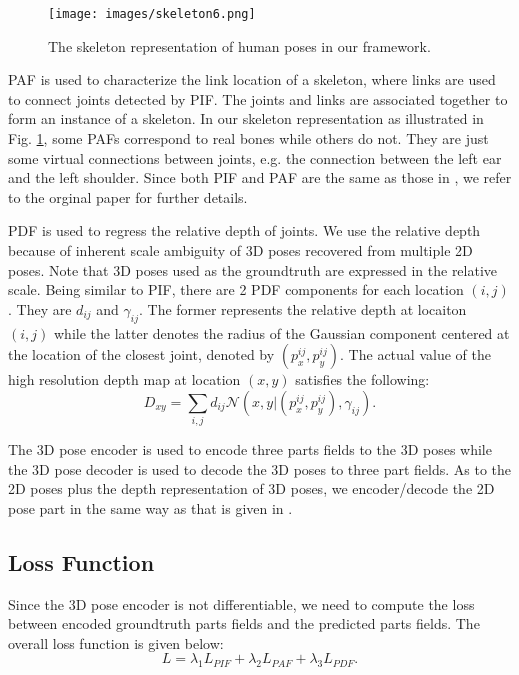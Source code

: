 \documentclass{article}
\begin{document}
\begin{figure}[h]
\centering
\texttt{[image: images/skeleton6.png]}
\caption{The skeleton representation of human poses in our framework.}
\label{fig:skeleton}
\end{figure}


PAF is used to characterize the link location of a skeleton, where links
are used to connect joints detected by PIF. The joints and links are
associated together to form an instance of a skeleton. In our skeleton
representation as illustrated in Fig. \ref{fig:skeleton}, some PAFs
correspond to real bones while others do not. They are just some virtual
connections between joints, e.g. the connection between the left ear and
the left shoulder. Since both PIF and PAF are the same as those in
\cite{kreiss2019pifpaf}, we refer to the orginal paper for further
details. 

PDF is used to regress the relative depth of joints. We use the relative
depth because of inherent scale ambiguity of 3D poses recovered from
multiple 2D poses. Note that 3D poses used as the groundtruth are
expressed in the relative scale. Being similar to PIF, there are 2 PDF
components for each location $(i, j)$. They are $d_{ij}$ and
$\gamma_{ij}$.  The former represents the relative depth at locaiton
$(i, j)$ while the latter denotes the radius of the Gaussian component
centered at the location of the closest joint, denoted by $(p_x^{ij},
p_y^{ij})$.  The actual value of the high resolution depth map at
location $(x, y)$ satisfies the following:
\begin{equation}
D_{xy} = \sum_{i,j} d_{ij} \mathcal{N}(x,y|(p_x^{ij}, p_y^{ij}),\gamma_{ij}).
\end{equation}

The 3D pose encoder is used to encode three parts fields to the 3D poses
while the 3D pose decoder is used to decode the 3D poses to three part
fields. As to the 2D poses plus the depth representation of 3D poses, we
encoder/decode the 2D pose part in the same way as that is given in
\cite{kreiss2019pifpaf}. 

\subsection{Loss Function}

Since the 3D pose encoder is not differentiable, we need to compute the
loss between encoded groundtruth parts fields and the predicted parts
fields.  The overall loss function is given below:
\begin{equation}\label{eq:loss_all}
L = \lambda_1 L_{PIF} + \lambda_2 L_{PAF} + \lambda_3 L_{PDF}.
\end{equation}
\end{document}
